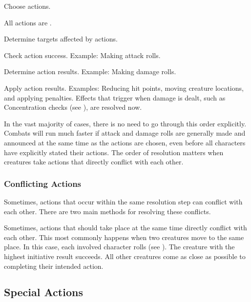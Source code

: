         \begin{enumerate*}
            \item Choose actions.
            \item All actions are .
            \item Determine targets affected by actions.
            \item Check action success.
                Example: Making attack rolls.
            \item Determine action results.
                Example: Making damage rolls.
            \item Apply action results.
                Examples: Reducing hit points, moving creature locations, and applying penalties.
                Effects that trigger when damage is dealt, such as Concentration checks (see ), are resolved now.
        \end{enumerate*}

        In the vast majority of cases, there is no need to go through this order explicitly.
        Combats will run much faster if attack and damage rolls are generally made and announced at the same time as the actions are chosen, even before all characters have explicitly stated their actions.
        The order of resolution matters when creatures take actions that directly conflict with each other.

        \subsubsection{Conflicting Actions}\label{Conflicting Actions}

            Sometimes, actions that occur within the same resolution step can conflict with each other.
            There are two main methods for resolving these conflicts.

             Sometimes, actions that should take place at the same time directly conflict with each other.
            This most commonly happens when two creatures move to the same place.
            In this case, each involved character rolls  (see ).
            The creature with the highest initiative result succeeds.
            All other creatures come as close as possible to completing their intended action.

    \subsection{Special Actions}

